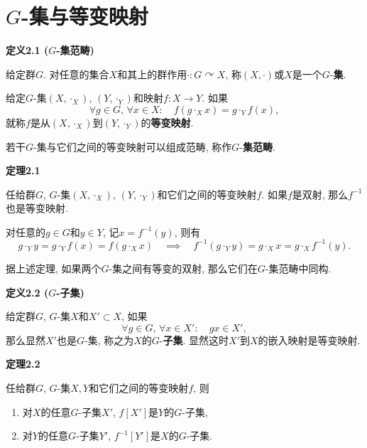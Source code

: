\documentclass[UTF8]{ctexart}
\begin{document}
\section{\texorpdfstring{$G$}{G}-集与等变映射}

\hypertarget{sec:定义2.1}{}
\noindent\textbf{定义2.1 ($G$-集范畴)}

给定群$G$. 对任意的集合$X$和其上的群作用$\cdot:G\curvearrowright X$,
称$(X,\cdot)$或$X$是一个$G$-\textbf{集}.

给定$G$-集$(X,\cdot_X)$, $(Y,\cdot_Y)$和映射$f:X\to Y$. 如果
\[
    \forall g\in G,\,\forall x\in X:\quad f(g\cdot_X x)=g\cdot_Y f(x),
\]
就称$f$是从$(X,\cdot_X)$到$(Y,\cdot_Y)$的\textbf{等变映射}.

若干$G$-集与它们之间的等变映射可以组成范畴, 称作$G$-\textbf{集范畴}.


\vspace{10pt}

\hypertarget{sec:定理2.1}{}
\noindent\textbf{定理2.1}

任给群$G$, $G$-集$(X,\cdot_X)$, $(Y,\cdot_Y)$和它们之间的等变映射$f$.
如果$f$是双射, 那么$f^{-1}$也是等变映射.


对任意的$g\in G$和$y\in Y$, 记$x=f^{-1}(y)$, 则有
\begin{equation*}
    g\cdot_Y y=g\cdot_Y f(x)=f(g\cdot_X x)\quad\implies\quad
    f^{-1}(g\cdot_Y y)=g\cdot_X x=g\cdot_X f^{-1}(y).
\tag*{\qedsymbol}\end{equation*}

\vspace{10pt}

据上述定理, 如果两个$G$-集之间有等变的双射, 那么它们在$G$-集范畴中同构.

\vspace{15pt}

\hypertarget{sec:定义2.2}{}
\noindent\textbf{定义2.2 ($G$-子集)}

给定群$G$, $G$-集$X$和$X'\subset X$, 如果
\[
    \forall g\in G,\,\forall x\in X':\quad gx\in X',
\]
那么显然$X'$也是$G$-集, 称之为$X$的$G$-\textbf{子集}.
显然这时$X'$到$X$的嵌入映射是等变映射.

\vspace{10pt}

\hypertarget{sec:定理2.2}{}
\noindent\textbf{定理2.2}

任给群$G$, $G$-集$X,Y$和它们之间的等变映射$f$, 则
\begin{enumerate}
    \item 对$X$的任意$G$-子集$X'$, $f[X']$是$Y$的$G$-子集,
    \item 对$Y$的任意$G$-子集$Y'$, $f^{-1}[Y']$是$X$的$G$-子集.
\end{enumerate}
\end{document}
